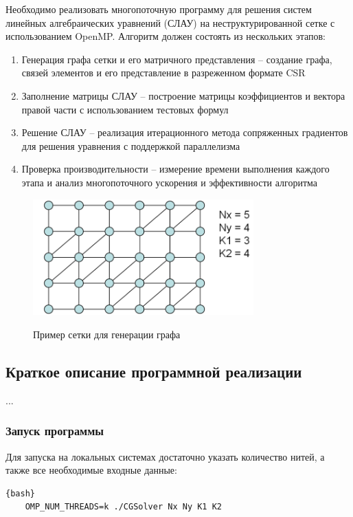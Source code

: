 \documentclass[12pt, a4paper]{article}
\begin{document}
Необходимо реализовать многопоточную программу для решения систем линейных алгебраических уравнений (СЛАУ) на неструктурированной сетке с использованием OpenMP. Алгоритм должен состоять из нескольких этапов:

\begin{enumerate}
	\item Генерация графа сетки и его матричного представления – создание графа, связей элементов и его представление в разреженном формате CSR
	\item Заполнение матрицы СЛАУ – построение матрицы коэффициентов и вектора правой части с использованием тестовых формул
	\item Решение СЛАУ – реализация итерационного метода сопряженных градиентов для решения уравнения с поддержкой параллелизма
	\item Проверка производительности – измерение времени выполнения каждого этапа и анализ многопоточного ускорения и эффективности алгоритма	
\end{enumerate}

\begin{figure}[H]
	\center
	\includegraphics[width=85mm]{grid} \\
	\caption{Пример сетки для генерации графа} 
	\label{fig:grid}
\end{figure}

\newpage

\subsection{Краткое описание программной реализации}

...

\subsubsection{Запуск программы}

Для запуска на локальных системах достаточно указать количество нитей, а также все необходимые входные данные:

\begin{lstlisting}{bash}
	OMP_NUM_THREADS=k ./CGSolver Nx Ny K1 K2
\end{lstlisting}
\end{document}
